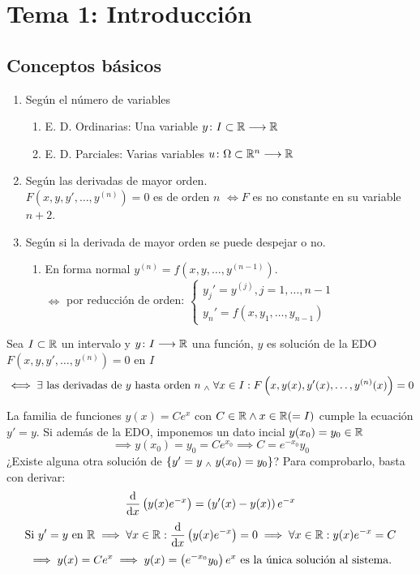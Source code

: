 \section{Tema 1: Introducción}
\subsection{Conceptos básicos}
\begin{defn}
	\item[] 
	\begin{enumerate}[topsep=1pt, itemsep=1pt,parsep=3pt]
		\item Según el número de variables
		\begin{enumerate}[topsep=1pt, itemsep=1pt,parsep=3pt]
			\item E. D. Ordinarias: Una variable $y \colon I\subset \mathbb{R} \longrightarrow \mathbb{R}$
			\item E. D. Parciales: Varias variables $u \colon \Omega\subset \mathbb{R}^{n} \longrightarrow \mathbb{R}$
		\end{enumerate}
		\item Según las derivadas de mayor orden. \\$F\left(x,y,y', \dots, y^{(n)}\right)=0$ es de orden $n$ \(\iff F\) es no constante en su variable $n+2$.
		\item Según si la derivada de mayor orden se puede despejar o no.
		\begin{enumerate}[topsep=1pt, itemsep=1pt,parsep=3pt]
			\item En forma normal $y^{(n)} = f(x, y, \dots, y^{(n-1)})$.
			\\ $\iff$ por reducción de orden:
			$\begin{cases}
				y_j' = y^{(j)}, j=1, \dots, n-1\\
				y_n'=f(x,y_1, \dots, y_{n-1})
			\end{cases}$
		\end{enumerate}
	\end{enumerate}    
\end{defn}
\begin{defn}
	Sea $I\subset \mathbb{R}$ un intervalo y $y \colon I \longrightarrow \mathbb{R}$ una función, $y$ es solución de la EDO $F\left(x,y,y', \dots, y^{(n)}\right)=0$ en $I$
	\[\iff \exists \text{ las derivadas de } y \text{ hasta orden } n \; _{\wedge} \; \forall x \in I : F\left(x,y(x),y'(x), \dots, y^{(n)}(x)\right)=0\]
\end{defn}
\begin{ejem}
	La familia de funciones $y(x)=Ce^x$ con $C\in \mathbb{R} \wedge x\in \mathbb{R} (=I)$ cumple la ecuación $y'=y$. Si además de la EDO, imponemos un dato incial $y(x_0)=y_0 \in \mathbb{R}$
	\[\implies y(x_0)=y_0=Ce^{x_0} \implies C=e^{-x_0}y_0\]
	¿Existe alguna otra solución de $\{y'=y \; _{\wedge} \; y(x_0)=y_0\}$?
	Para comprobarlo, basta con derivar:
	\[\odv{}{x}\left(y(x)e^{-x}\right)=\left(y'(x) - y(x)\right)e^{-x}\]
	\[\tex{Si } y'=y \tex{ en } \R \implies \forall x \in \R : \odv{}{x}\left(y(x)e^{-x}\right)=0 \implies \forall x \in \R : y(x)e^{-x} = C\]
	\[\implies y(x)=Ce^x \implies y(x)=\left(e^{-x_0}y_0\right)e^x \text{ es la única solución al sistema.}\]
\end{ejem}

